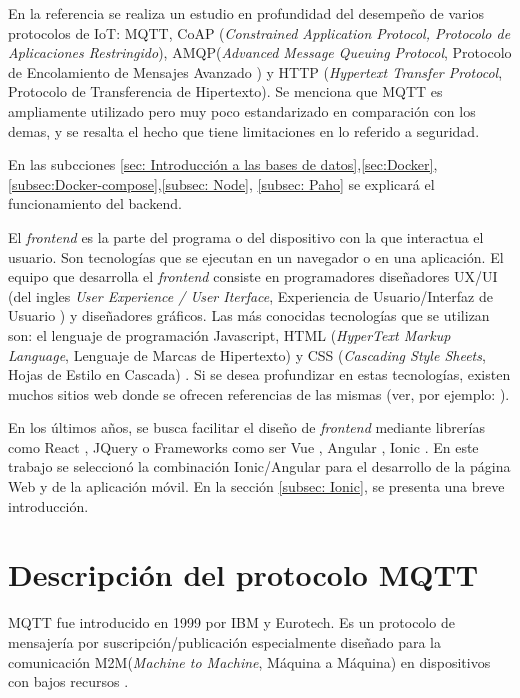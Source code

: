 En la referencia \citep{ARTICLE:2} se realiza un estudio en profundidad del desempeño de varios protocolos de IoT: MQTT, CoAP (\textit{Constrained Application Protocol, Protocolo de Aplicaciones Restringido}), AMQP(\textit{Advanced Message Queuing Protocol}, Protocolo de Encolamiento de Mensajes Avanzado ) y HTTP (\textit{Hypertext Transfer Protocol}, Protocolo de Transferencia de Hipertexto). Se menciona que MQTT es ampliamente utilizado pero muy poco estandarizado en comparación con los demas, y se resalta el hecho que tiene limitaciones en lo referido a seguridad.

En las subcciones \ref{sec: Introducción a las bases de datos},\ref{sec:Docker},\ref{subsec:Docker-compose},\ref{subsec: Node}, \ref{subsec: Paho} se explicará el funcionamiento del backend.

El \textit{frontend} es la parte del programa o del dispositivo con la que interactua el usuario. Son tecnologías que se ejecutan en un navegador o en una aplicación. El equipo que desarrolla el \textit{frontend} consiste en programadores diseñadores UX/UI (del ingles \textit{User Experience / User Iterface}, Experiencia de Usuario/Interfaz de Usuario ) y diseñadores gráficos. Las más conocidas tecnologías que se utilizan son: el lenguaje de programación Javascript, HTML (\textit{HyperText Markup Language}, Lenguaje de Marcas de Hipertexto) y CSS (\textit{Cascading Style Sheets}, Hojas de Estilo en Cascada) \citep{ARTICLE:4}. Si se desea profundizar en estas tecnologías, existen muchos sitios web donde se ofrecen referencias de las mismas (ver, por ejemplo: \citep{WEBSITE:13}).  

En los últimos años, se busca facilitar el diseño de  \textit{frontend} mediante librerías como React \citep{WEBSITE:14},  JQuery \citep{WEBSITE:17} o Frameworks como ser Vue \citep{WEBSITE:15}, Angular \citep{WEBSITE:16}, Ionic \citep{WEBSITE:18}. En este trabajo se seleccionó la combinación Ionic/Angular para el desarrollo de la página Web y de la aplicación móvil. En la sección \ref{subsec: Ionic}, se presenta una breve introducción.

\section{Descripción del protocolo MQTT}
\label{sec:Descripción del protocolo MQTT}

MQTT fue introducido en 1999 por IBM y Eurotech. Es un protocolo de mensajería por suscripción/publicación especialmente diseñado para la comunicación M2M(\textit{Machine to Machine}, Máquina a Máquina) en dispositivos con bajos recursos \citep{WEBSITE:5} .

